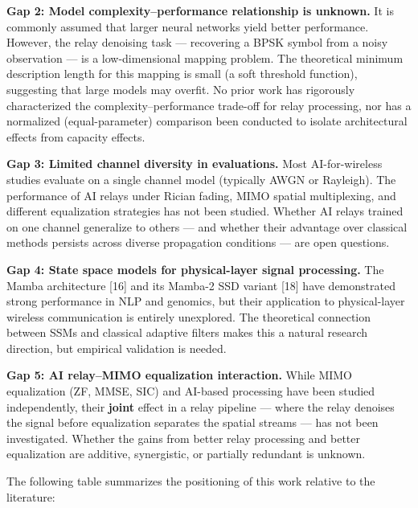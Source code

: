 \documentclass[
  english,
  12pt,
  12pt,
  a4paper,
  oneside]{report}
\begin{document}
\textbf{Gap 2: Model complexity--performance relationship is unknown.} It is commonly assumed that larger neural networks yield better performance. However, the relay denoising task --- recovering a BPSK symbol from a noisy observation --- is a low-dimensional mapping problem. The theoretical minimum description length for this mapping is small (a soft threshold function), suggesting that large models may overfit. No prior work has rigorously characterized the complexity--performance trade-off for relay processing, nor has a normalized (equal-parameter) comparison been conducted to isolate architectural effects from capacity effects.

\textbf{Gap 3: Limited channel diversity in evaluations.} Most AI-for-wireless studies evaluate on a single channel model (typically AWGN or Rayleigh). The performance of AI relays under Rician fading, MIMO spatial multiplexing, and different equalization strategies has not been studied. Whether AI relays trained on one channel generalize to others --- and whether their advantage over classical methods persists across diverse propagation conditions --- are open questions.

\textbf{Gap 4: State space models for physical-layer signal processing.} The Mamba architecture {[}16{]} and its Mamba-2 SSD variant {[}18{]} have demonstrated strong performance in NLP and genomics, but their application to physical-layer wireless communication is entirely unexplored. The theoretical connection between SSMs and classical adaptive filters makes this a natural research direction, but empirical validation is needed.

\textbf{Gap 5: AI relay--MIMO equalization interaction.} While MIMO equalization (ZF, MMSE, SIC) and AI-based processing have been studied independently, their \textbf{joint} effect in a relay pipeline --- where the relay denoises the signal before equalization separates the spatial streams --- has not been investigated. Whether the gains from better relay processing and better equalization are additive, synergistic, or partially redundant is unknown.

The following table summarizes the positioning of this work relative to the literature:
\end{document}
